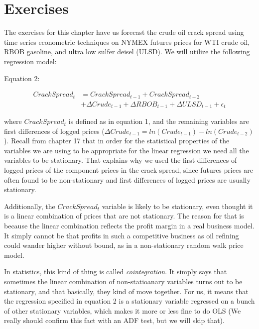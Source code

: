 \documentclass[
  letterpaper,
  DIV=11,
  numbers=noendperiod]{scrreprt}
\begin{document}
\section{Exercises}\label{exercises-8}

The exercises for this chapter have us forecast the crude oil crack
spread using time series econometric techniques on NYMEX futures prices
for WTI crude oil, RBOB gasoline, and ultra low sulfer deisel (ULSD). We
will utilize the following regression model:

Equation 2:

\begin{align}
Crack Spread_t &= Crack Spread_{t-1} + Crack Spread_{t-2}    \\
                  & + \Delta Crude_{t-1} + \Delta RBOB_{t-1} + \Delta ULSD_{t-1} + \epsilon_t
\end{align}

where \(Crack Spread_t\) is defined as in equation 1, and the remaining
variables are first differences of logged prices
(\(\Delta Crude_{t-1} = ln(Crude_{t-1}) - ln(Crude_{t-2})\)). Recall
from chapter 17 that in order for the statistical properties of the
variables we are using to be appropriate for the linear regression we
need all the variables to be stationary. That explains why we used the
first differences of logged prices of the component prices in the crack
spread, since futures prices are often found to be non-stationary and
first differences of logged prices are usually stationary.

Additionally, the \(Crack Spread_t\) variable is likely to be
stationary, even thought it is a linear combination of prices that are
not stationary. The reason for that is because the linear combination
reflects the profit margin in a real business model. It simply cannot be
that profits in such a competitive business as oil refining could wander
higher without bound, as in a non-stationary random walk price model.

In statistics, this kind of thing is called \emph{cointegration}. It
simply says that sometimes the linear combination of non-statioanary
variables turns out to be stationary, and that basically, they kind of
move together. For us, it means that the regression specified in
equation 2 is a stationary variable regressed on a bunch of other
stationary variables, which makes it more or less fine to do OLS (We
really should confirm this fact with an ADF test, but we will skip
that).
\end{document}
